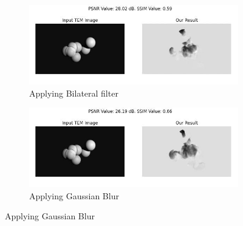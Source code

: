\vspace{20pt}

\begin{figure}[H]
    \centering
    \begin{subfigure}{.47\textwidth} %
        \includegraphics[width=\textwidth]{img/Results/Synthetic data/Blender_Data_4_bilateral_filter.jpg}
        \caption{Applying Bilateral filter}
        \label{fig:Image1}
    \end{subfigure}
    \hfill
    \begin{subfigure}{.47\textwidth} %
        \includegraphics[width=\textwidth]{img/Results/Synthetic data/Blender_Data_4_gaussian_blur.jpg}
        \caption{Applying Gaussian Blur}
        \label{fig:Image2}
    \end{subfigure}
    
    \vspace{15pt} %
    

\end{figure}
